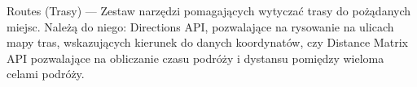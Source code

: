         \noindent Routes (Trasy) — Zestaw narzędzi pomagających wytyczać trasy do pożądanych miejsc. Należą do niego: Directions API, pozwalające na rysowanie na ulicach mapy tras, wskazujących kierunek
        do danych koordynatów, czy Distance Matrix API pozwalające na obliczanie czasu podróży i dystansu pomiędzy wieloma celami podróży.

